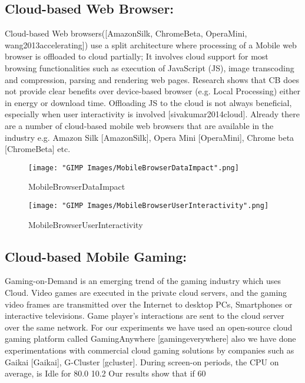 \documentclass[12pt]{report}
\begin{document}
\subsection{Cloud-based Web Browser:}
Cloud-based Web browsers([AmazonSilk, ChromeBeta, OperaMini, wang2013accelerating]) use a split architecture where processing of a Mobile web browser is offloaded to cloud partially; It involves cloud support for most browsing functionalities such as execution of JavaScript (JS), image transcoding and compression, parsing and rendering web pages.
 Research shows that CB does not provide clear benefits over device-based browser (e.g. Local Processing) either in energy or download time. Offloading JS to the cloud is not always beneficial, especially when user interactivity is involved [sivakumar2014cloud].
Already there are a number of cloud-based mobile web browsers that are available in the industry e.g. Amazon Silk [AmazonSilk], Opera Mini [OperaMini], Chrome beta [ChromeBeta] etc.
\begin{figure}[h]
  \centering
  \texttt{[image: "GIMP Images/MobileBrowserDataImpact".png]}
  \caption{MobileBrowserDataImpact}
  \label{fig:MobileBrowserDataImpact}
\end{figure}

\begin{figure}[h]
  \centering
  \texttt{[image: "GIMP Images/MobileBrowserUserInteractivity".png]}
  \caption{MobileBrowserUserInteractivity}
  \label{fig:MobileBrowserUserInteractivity}
\end{figure}

\subsection{Cloud-based Mobile Gaming:}
Gaming-on-Demand is an emerging trend of the gaming industry which uses Cloud. Video games are executed in the private cloud servers, and the gaming video frames are transmitted over the Internet to desktop PCs, Smartphones or interactive televisions. Game player’s interactions are sent to the cloud server over the same network. For our experiments we have used an open-source cloud gaming platform called GamingAnywhere [gamingeverywhere] also we have done experimentations with commercial cloud gaming solutions by companies such as Gaikai [Gaikai], G-Cluster [gcluster].
During screen-on periods, the CPU on average, is Idle for 80.0%
10.2%
Our results show that if 60%
\end{document}
